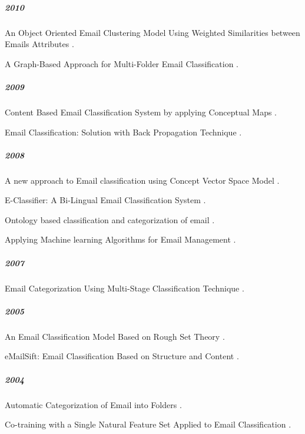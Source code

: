 \subparagraph*{2010}
\begin{my_itemize}
  \item An Object Oriented Email Clustering Model Using Weighted Similarities between Emails Attributes \cite{NARESH10}.
  \item A Graph-Based Approach for Multi-Folder Email Classification \cite{sift02}.
\end{my_itemize}

\subparagraph*{2009}
\begin{my_itemize}
  \item Content Based Email Classification System by applying Conceptual Maps \cite{BASKARAN09}.
  \item Email Classification: Solution with Back Propagation Technique \cite{mous05}.
\end{my_itemize}

\subparagraph*{2008}
\begin{my_itemize}
  \item A new approach to Email classification using Concept Vector Space Model \cite{CHAO08}.
  \item E-Classifier: A Bi-Lingual Email Classification System \cite{NOUF08}.
  \item Ontology based classification and categorization of email \cite{BALAKUMAR08}.
  \item Applying Machine learning Algorithms for Email Management \cite{mous03}.
\end{my_itemize}

\subparagraph*{2007}
\begin{my_itemize}
  \item Email Categorization Using Multi-Stage Classification Technique \cite{MD07}.
\end{my_itemize}

\subparagraph*{2005}
\begin{my_itemize}
  \item An Email Classification Model Based on Rough Set Theory \cite{WENQING05}.
  \item eMailSift: Email Classification Based on Structure and Content \cite{sift01}.
\end{my_itemize}

\subparagraph*{2004}
\begin{my_itemize}
  \item Automatic Categorization of Email into Folders \cite{RON04}.
  \item Co-training with a Single Natural Feature Set Applied to Email Classification \cite{mous04}.
\end{my_itemize}

